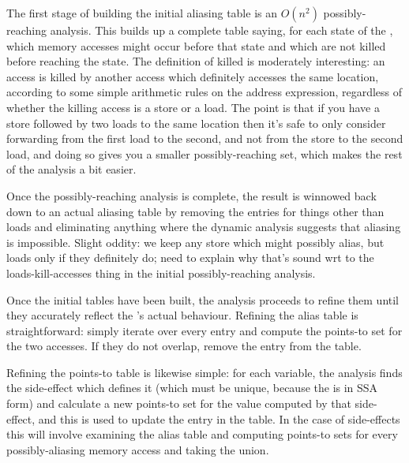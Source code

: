 The first stage of building the initial aliasing table is an $O(n^2)$
possibly-reaching analysis.  This builds up a complete table saying,
for each state of the {\StateMachine}, which memory accesses might
occur before that state and which are not killed before reaching the
state.  The definition of killed is moderately interesting: an access
is killed by another access which definitely accesses the same
location, according to some simple arithmetic rules on the address
expression, regardless of whether the killing access is a store or a
load.  The point is that if you have a store followed by two loads to
the same location then it's safe to only consider forwarding from the
first load to the second, and not from the store to the second load,
and doing so gives you a smaller possibly-reaching set, which makes
the rest of the analysis a bit easier.

Once the possibly-reaching analysis is complete, the result is
winnowed back down to an actual aliasing table by removing the entries
for things other than loads and eliminating anything where the dynamic
analysis suggests that aliasing is impossible.  
Slight oddity: we keep any store which might possibly alias, but loads
only if they definitely do; need to explain why that's sound wrt to
the loads-kill-accesses thing in the initial possibly-reaching
analysis.


Once the initial tables have been built, the analysis proceeds to
refine them until they accurately reflect the {\StateMachine}'s actual
behaviour.  Refining the alias table is straightforward: simply
iterate over every entry and compute the points-to set for the two
accesses.  If they do not overlap, remove the entry from the table.

Refining the points-to table is likewise simple: for each variable,
the analysis finds the side-effect which defines it (which must be
unique, because the {\StateMachine} is in SSA form) and calculate a
new points-to set for the value computed by that side-effect, and this
is used to update the entry in the table.  In the case of 
side-effects this will involve examining the alias table and computing
points-to sets for every possibly-aliasing memory access and taking
the union.

